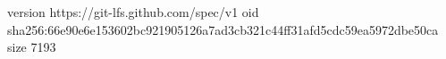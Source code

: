 version https://git-lfs.github.com/spec/v1
oid sha256:66e90e6e153602bc921905126a7ad3cb321c44ff31afd5cdc59ea5972dbe50ca
size 7193
